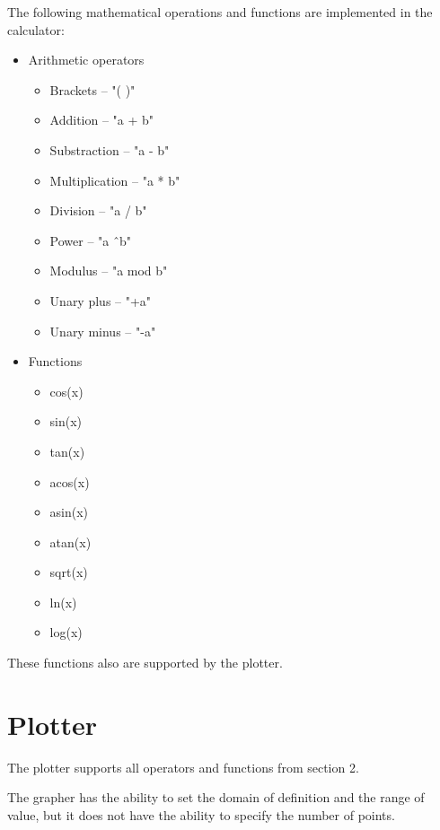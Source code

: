 \documentclass[12pt, a4paper]{article}
\begin{document}
The following mathematical operations and functions are implemented in the calculator:
  \begin{itemize}
    \item Arithmetic operators
    \begin{itemize}
      \item Brackets -- "( )"
      \item Addition -- "a + b"
      \item Substraction -- "a - b"
      \item Multiplication -- "a * b"
      \item Division -- "a / b"
      \item Power -- "a \^\ b"
      \item Modulus -- "a mod b"
      \item Unary plus -- "+a"
      \item Unary minus -- "-a"
    \end{itemize}
    \item Functions
    \begin{itemize}
      \item cos(x)
      \item sin(x)
      \item tan(x)
      \item acos(x)
      \item asin(x)
      \item atan(x)
      \item sqrt(x)
      \item ln(x)
      \item log(x)
    \end{itemize}
  \end{itemize}

These functions also are supported by the plotter.

\pagebreak

\section{Plotter}

The plotter supports all operators and functions from section 2.

The grapher has the ability to set the domain of definition and the range of value, but it does not have the ability to specify the number of points.
\end{document}

